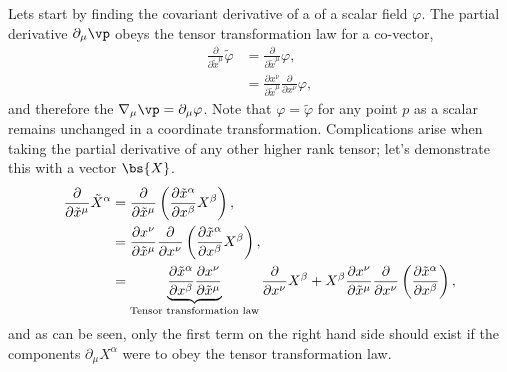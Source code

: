 Lets start by finding the covariant derivative of a of a scalar field $\varphi$. The partial derivative $\partial_\mu \vp$ obeys the tensor transformation law for a co-vector,
\begin{align}
\frac{\partial}{\partial \tilde{x}^\mu} \tilde{\varphi} &=\frac{\partial}{\partial \tilde{x}^\mu} {\varphi} ,\\
                                                        &=\frac{\partial x^\nu}{\partial\tilde{x}^\mu}\frac{\partial}{\partial {x}^\nu} {\varphi},
\end{align}
and therefore the $\nabla_\mu \vp = \partial_\mu \varphi$. Note that $\varphi=\tilde{\varphi}$ for any point $p$ as a scalar remains unchanged in a coordinate transformation. Complications arise when taking the partial derivative of any other higher rank tensor; let's demonstrate this with a vector $\bs{X}$.
\begin{align}
\frac{\partial}{\partial \tilde{x}^\mu} \tilde{X}^\alpha &= \frac{\partial}{\partial \tilde{x}^\mu}\left( \frac{\partial \tilde{x}^\alpha}{\partial x^\beta}{X}^\beta\right),\\
                                                         &= \frac{\partial x^\nu}{\partial \tilde{x}^\mu}\frac{\partial}{\partial {x}^\nu}\left( \frac{\partial \tilde{x}^\alpha}{\partial x^\beta}{X}^\beta\right),\\
                                                         &= \underbrace{\frac{\partial \tilde{x}^\alpha}{\partial x^\beta}\frac{\partial x^\nu}{\partial \tilde{x}^\mu}}_{\mathrm{Tensor}\,\,\rm{transformation}\,\,\rm{law}}\frac{\partial}{\partial {x}^\nu} {X}^\beta + {X}^\beta\frac{\partial x^\nu}{\partial \tilde{x}^\mu}\frac{\partial}{\partial {x}^\nu}\left( \frac{\partial \tilde{x}^\alpha}{\partial x^\beta}\right),
\end{align}
and as can be seen, only the first term on the right hand side should exist if the components $\partial_\mu X^\alpha$ were to obey the tensor transformation law. 

